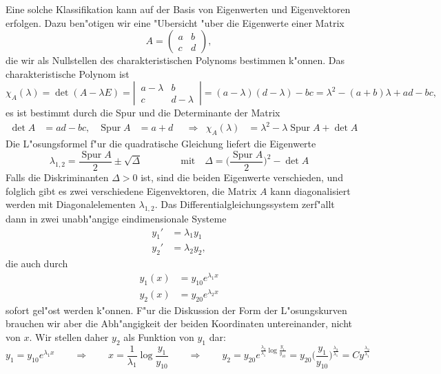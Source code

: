 Eine solche Klassifikation kann auf der Basis von Eigenwerten und
Eigenvektoren erfolgen.
%
%
Dazu ben"otigen wir eine "Ubersicht "uber die Eigenwerte einer
Matrix
\[
A=\begin{pmatrix}a&b\\c&d\end{pmatrix},
\]
die wir als Nullstellen des charakteristischen Polynoms bestimmen
k"onnen.
Das charakteristische Polynom ist
\[
\chi_A(\lambda)
=
\det(A-\lambda E)
=
\left|\,\begin{matrix}a-\lambda&b\\c&d-\lambda\end{matrix}\,\right|
=
(a-\lambda)(d-\lambda)-bc
=
\lambda^2-(a+b)\lambda + ad-bc,
\]
es ist bestimmt durch die Spur und die Determinante der Matrix
\[
\begin{aligned}
\det A&=ad -bc,
&
\operatorname{Spur}A&=a+d
&
&\Rightarrow
&
\chi_A(\lambda)&=\lambda^2-\lambda \operatorname{Spur}A+\det A
\end{aligned}
\]
Die L"osungsformel f"ur die quadratische Gleichung liefert die
Eigenwerte
\[
\lambda_{1,2}
=
\frac{\operatorname{Spur}A}2\pm\sqrt{\Delta}
\qquad
\qquad
\text{mit}\quad
\Delta = \biggl(\frac{\operatorname{Spur}A}2\biggr)^2 - \det A
\]
Falls die Diskriminanten $\Delta > 0$ ist, sind die beiden Eigenwerte
%
verschieden, und folglich gibt es zwei verschiedene Eigenvektoren,
die Matrix $A$ kann diagonalisiert werden mit Diagonalelementen
$\lambda_{1,2}$.  Das Differentialgleichungssystem zerf"allt dann
in zwei unabh"angige eindimensionale Systeme
\begin{align*}
y_1'&= \lambda_1 y_1\\
y_2'&= \lambda_2 y_2,
\end{align*}
die auch durch
\begin{align*}
y_1(x)&=y_{10} e^{\lambda_1 x}\\
y_2(x)&=y_{20} e^{\lambda_2 x}
\end{align*}
sofort gel"ost werden k"onnen.
F"ur die Diskussion der Form der L"osungskurven brauchen wir aber die
Abh"angigkeit der beiden Koordinaten untereinander, nicht von $x$.
Wir stellen daher $y_2$ als Funktion von $y_1$ dar:
\[
y_1=y_{10} e^{\lambda_1 x}
\qquad\Rightarrow\qquad
x=\frac1{\lambda_1}\log\frac{y_1}{y_{10}}
\qquad\Rightarrow\qquad
y_2
=
y_{20} e^{\frac{\lambda_2}{\lambda_1}\log\frac{y_1}{y_{10}}}
=
y_{20}\biggl(\frac{y_1}{y_{10}}\biggr)^{\frac{\lambda_2}{\lambda_1}}
=
Cy^{\frac{\lambda_2}{\lambda_1}}
\]
